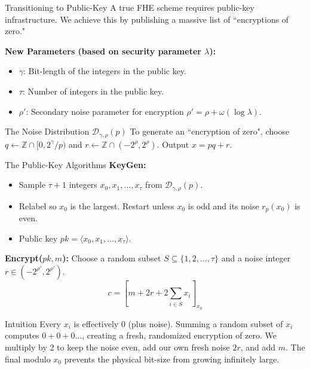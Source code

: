 \documentclass[10pt]{beamer}
\begin{document}
\begin{frame}{Transitioning to Public-Key}
    A true FHE scheme requires public-key infrastructure. We achieve this by publishing a massive list of ``encryptions of zero."
    \pause

    \vspace{0.2cm}
    \textbf{New Parameters (based on security parameter $\lambda$):}
    \begin{itemize}
        \item $\gamma$: Bit-length of the integers in the public key.
        \item $\tau$: Number of integers in the public key.
        \item $\rho'$: Secondary noise parameter for encryption $\rho' = \rho + \omega(\log \lambda)$.
    \end{itemize}
    \pause

    \vspace{0.2cm}
    \begin{block}{The Noise Distribution $\mathcal{D}_{\gamma,\rho}(p)$}
    To generate an ``encryption of zero", choose $q \leftarrow \mathbb{Z} \cap [0, 2^\gamma/p)$ and $r \leftarrow \mathbb{Z} \cap (-2^\rho, 2^\rho)$. 
    Output $x = pq + r$.
    \end{block}
\end{frame}

\begin{frame}{The Public-Key Algorithms}
    \textbf{KeyGen:}
    \begin{itemize}
        \item Sample $\tau + 1$ integers $x_0, x_1, \dots, x_\tau$ from $\mathcal{D}_{\gamma,\rho}(p)$. 
        \item Relabel so $x_0$ is the largest. Restart unless $x_0$ is odd and its noise $r_p(x_0)$ is even.
        \item Public key $pk = \langle x_0, x_1, \dots, x_\tau \rangle$.
    \end{itemize}
    \pause
    
    \vspace{0.3cm}
    \textbf{Encrypt($pk, m$):}
    Choose a random subset $S \subseteq \{1, 2, \dots, \tau\}$ and a noise integer $r \in (-2^{\rho'}, 2^{\rho'})$.
    $$c = \left[ m + 2r + 2\sum_{i \in S} x_i \right]_{x_0}$$
    \pause
    
    \begin{block}{Intuition}
    Every $x_i$ is effectively $0$ (plus noise). Summing a random subset of $x_i$ computes $0+0+0\dots$, creating a fresh, randomized encryption of zero. We multiply by 2 to keep the noise even, add our own fresh noise $2r$, and add $m$. The final modulo $x_0$ prevents the physical bit-size from growing infinitely large.
    \end{block}
\end{frame}
\end{document}
